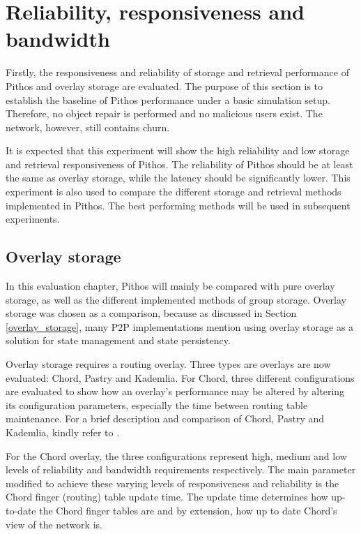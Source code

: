 \section{Reliability, responsiveness and bandwidth}

Firstly, the responsiveness and reliability of storage and retrieval performance of Pithos and overlay storage are evaluated. The purpose of this section is to establish the baseline of Pithos performance under a basic simulation setup. Therefore, no object repair is performed and no malicious users exist. The network, however, still contains churn.

It is expected that this experiment will show the high reliability and low storage and retrieval responsiveness of Pithos. The reliability of Pithos should be at least the same as overlay storage, while the latency should be significantly lower. This experiment is also used to compare the different storage and retrieval methods implemented in Pithos. The best performing methods will be used in subsequent experiments.

\subsection{Overlay storage}
\label{overlay_results}

In this evaluation chapter, Pithos will mainly be compared with pure overlay storage, as well as the different implemented methods of group storage. Overlay storage was chosen as a comparison, because as discussed in Section \ref{overlay_storage}, many P2P implementations mention using overlay storage as a solution for state management and state persistency.

Overlay storage requires a routing overlay. Three types are overlays are now evaluated: Chord, Pastry and Kademlia. For Chord, three different configurations are evaluated to show how an overlay's performance may be altered by altering its configuration parameters, especially the time between routing table maintenance. For a brief description and comparison of Chord, Pastry and Kademlia, kindly refer to \cite{overlay_survey}.

For the Chord overlay, the three configurations represent high, medium and low levels of reliability and bandwidth requirements respectively. The main parameter modified to achieve these varying levels of responsiveness and reliability is the Chord finger (routing) table update time. The update time determines how up-to-date the Chord finger tables are and by extension, how up to date Chord's view of the network is.

